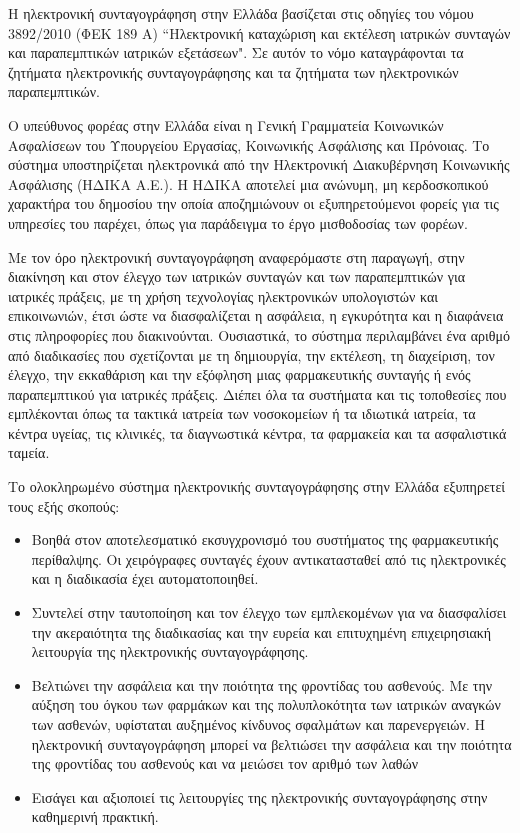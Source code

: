 		Η ηλεκτρονική συνταγογράφηση στην Ελλάδα βασίζεται στις οδηγίες του νόμου 3892/2010 (ΦΕΚ 189 Α) ``Ηλεκτρονική καταχώριση και εκτέλεση ιατρικών συνταγών και παραπεμπτικών ιατρικών εξετάσεων". Σε αυτόν το νόμο καταγράφονται τα ζητήματα ηλεκτρονικής συνταγογράφησης και τα ζητήματα των ηλεκτρονικών παραπεμπτικών.
		
		Ο υπεύθυνος φορέας στην Ελλάδα είναι η Γενική Γραμματεία Κοινωνικών Ασφαλίσεων του Υπουργείου Εργασίας, Κοινωνικής Ασφάλισης και Πρόνοιας. Το σύστημα υποστηρίζεται ηλεκτρονικά από την Ηλεκτρονική Διακυβέρνηση Κοινωνικής Ασφάλισης (ΗΔΙΚΑ Α.Ε.). Η ΗΔΙΚΑ αποτελεί μια ανώνυμη, μη κερδοσκοπικού χαρακτήρα του δημοσίου την οποία αποζημιώνουν οι εξυπηρετούμενοι φορείς για τις υπηρεσίες του παρέχει, όπως για παράδειγμα το έργο μισθοδοσίας των φορέων\cite{idika}.
		
		Με τον όρο ηλεκτρονική συνταγογράφηση αναφερόμαστε στη παραγωγή, στην διακίνηση και στον έλεγχο των ιατρικών συνταγών και των παραπεμπτικών για ιατρικές πράξεις, με τη χρήση τεχνολογίας ηλεκτρονικών υπολογιστών και επικοινωνιών, έτσι ώστε να διασφαλίζεται η ασφάλεια, η εγκυρότητα και η διαφάνεια στις πληροφορίες που διακινούνται. Ουσιαστικά, το σύστημα περιλαμβάνει ένα αριθμό από διαδικασίες που σχετίζονται με τη δημιουργία, την εκτέλεση, τη διαχείριση, τον έλεγχο, την εκκαθάριση και την εξόφληση μιας φαρμακευτικής συνταγής ή ενός παραπεμπτικού για ιατρικές πράξεις. Διέπει όλα τα συστήματα και τις τοποθεσίες που εμπλέκονται όπως τα τακτικά ιατρεία των νοσοκομείων ή τα ιδιωτικά ιατρεία, τα κέντρα υγείας, τις κλινικές, τα διαγνωστικά κέντρα, τα φαρμακεία και τα ασφαλιστικά ταμεία.


		
		Το ολοκληρωμένο σύστημα ηλεκτρονικής συνταγογράφησης στην Ελλάδα εξυπηρετεί τους εξής σκοπούς:
		
		\begin{itemize}

		\item  Βοηθά στον αποτελεσματικό εκσυγχρονισμό του συστήματος της φαρμακευτικής περίθαλψης. Οι χειρόγραφες συνταγές έχουν αντικατασταθεί από τις ηλεκτρονικές και η διαδικασία έχει αυτοματοποιηθεί.
		 
		\item Συντελεί στην ταυτοποίηση και τον έλεγχο των εμπλεκομένων για να διασφαλίσει την ακεραιότητα της διαδικασίας και την ευρεία και επιτυχημένη επιχειρησιακή λειτουργία της ηλεκτρονικής συνταγογράφησης.
		
		\item Βελτιώνει την ασφάλεια και την ποιότητα της φροντίδας του ασθενούς. Με την αύξηση του όγκου των φαρμάκων και της πολυπλοκότητα των ιατρικών αναγκών των ασθενών, υφίσταται αυξημένος κίνδυνος σφαλμάτων και παρενεργειών. Η ηλεκτρονική συνταγογράφηση μπορεί να βελτιώσει την ασφάλεια και την ποιότητα της φροντίδας του ασθενούς και να μειώσει τον αριθμό των λαθών
		
		\item Εισάγει και αξιοποιεί τις λειτουργίες της ηλεκτρονικής συνταγογράφησης στην καθημερινή πρακτική.

		\end{itemize}

